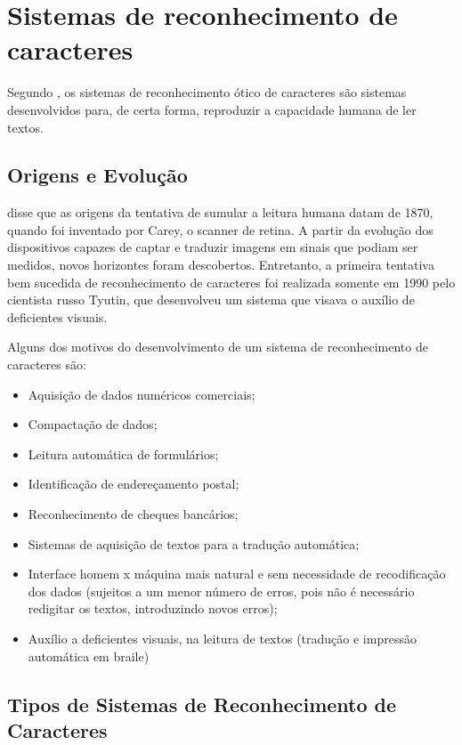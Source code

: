 \section{Sistemas de reconhecimento de caracteres}
	
	Segundo \cite{silva2003reconhecimento}, os sistemas de reconhecimento ótico de caracteres são sistemas desenvolvidos para, de certa forma, reproduzir a capacidade humana de ler textos.

	\subsection{Origens e Evolução}
	
		\cite{man1986pattern} disse que as origens da tentativa de sumular a leitura humana datam de 1870, quando foi inventado por Carey, o scanner de retina. A partir da evolução dos dispositivos capazes de captar e traduzir imagens em sinais que podiam ser medidos, novos horizontes foram descobertos. Entretanto, a primeira tentativa bem sucedida de reconhecimento de caracteres foi realizada somente em 1990 pelo cientista russo Tyutin, que desenvolveu um sistema que visava o auxílio de deficientes visuais.
	
		Alguns dos motivos do desenvolvimento de um sistema de reconhecimento de caracteres são:
		
		\begin{itemize}
			\item Aquisição de dados numéricos comerciais;
			\item Compactação de dados;
			\item Leitura automática de formulários;
			\item Identificação de endereçamento postal;
			\item Reconhecimento de cheques bancários;
			\item Sistemas de aquisição de textos para a tradução automática;
			\item Interface homem x máquina mais natural e sem necessidade de recodificação dos dados (sujeitos a um menor número de erros, pois não é necessário redigitar os textos, introduzindo novos erros);
			\item Auxílio a deficientes visuais, na leitura de textos (tradução e impressão automática em braile)
		\end{itemize}

	\subsection{Tipos de Sistemas de Reconhecimento de Caracteres}
		

